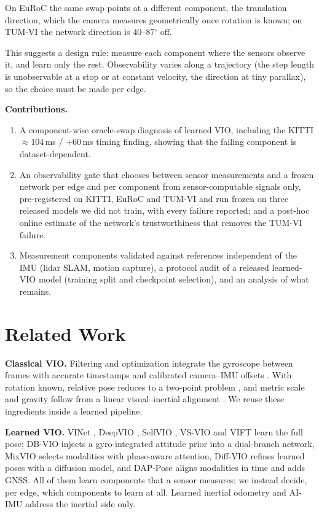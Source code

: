 \documentclass[letterpaper,journal]{IEEEtran}
\begin{document}
On EuRoC the same swap points at a different component, the translation direction, which the camera measures geometrically once rotation is known; on TUM-VI the network direction is 40--87$^\circ$ off.

This suggests a design rule: measure each component where the sensors observe it, and learn only the rest. Observability varies along a trajectory (the step length is unobservable at a stop or at constant velocity, the direction at tiny parallax), so the choice must be made per edge.

\textbf{Contributions.}
\begin{enumerate}
\item A component-wise oracle-swap diagnosis of learned VIO, including the KITTI $\approx$104\,ms / +60\,ms timing finding, showing that the failing component is dataset-dependent.
\item An observability gate that chooses between sensor measurements and a frozen network per edge and per component from sensor-computable signals only, pre-registered on KITTI, EuRoC and TUM-VI and run frozen on three released models we did not train, with every failure reported; and a post-hoc online estimate of the network's trustworthiness that removes the TUM-VI failure.
\item Measurement components validated against references independent of the IMU (lidar SLAM, motion capture), a protocol audit of a released learned-VIO model (training split and checkpoint selection), and an analysis of what remains.
\end{enumerate}

\section{Related Work}

\textbf{Classical VIO.} Filtering \cite{Mourikis2007} and optimization \cite{Leutenegger2015,Qin2018,Campos2021} integrate the gyroscope between frames with accurate timestamps and calibrated camera--IMU offsets \cite{Furgale2013,Qin2018b}. With rotation known, relative pose reduces to a two-point problem \cite{Kneip2011,Troiani2014}, and metric scale and gravity follow from a linear visual--inertial alignment \cite{Martinelli2014,Qin2017}. We reuse these ingredients inside a learned pipeline.

\textbf{Learned VIO.} VINet \cite{Clark2017}, DeepVIO \cite{Han2019}, SelfVIO \cite{Almalioglu2022}, VS-VIO \cite{Yang2022} and VIFT \cite{Kurt2024} learn the full pose; DB-VIO \cite{Wan2026} injects a gyro-integrated attitude prior into a dual-branch network, MixVIO \cite{Ma2026} selects modalities with phase-aware attention, Diff-VIO \cite{Qin2026} refines learned poses with a diffusion model, and DAP-Pose \cite{DAPPose} aligns modalities in time and adds GNSS. All of them learn components that a sensor measures; we instead decide, per edge, which components to learn at all. Learned inertial odometry \cite{Liu2020,Herath2020} and AI-IMU \cite{Brossard2020} address the inertial side only.
\end{document}
